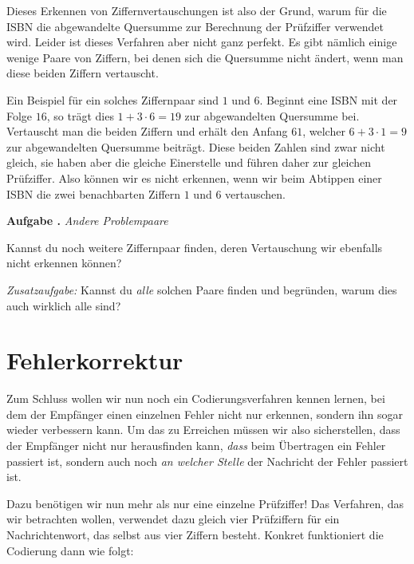 \documentclass[a4paper,ngerman,12pt]{scrartcl}
\theoremstyle{definition}
\theoremstyle{plain}
\theoremstyle{remark}
\newlength{\aufgabenskip}
\newcounter{aufgabennummer}
\newenvironment{aufgabe}[1]{
	\addtocounter{aufgabennummer}{1}
	\textbf{Aufgabe \theaufgabennummer.} \emph{#1} \par
}{\vspace{\aufgabenskip}}
\begin{document}
Dieses Erkennen von Ziffernvertauschungen ist also der Grund, warum für die ISBN die abgewandelte Quersumme zur Berechnung der Prüfziffer verwendet wird. Leider ist dieses Verfahren aber nicht ganz perfekt. Es gibt nämlich einige wenige Paare von Ziffern, bei denen sich die Quersumme nicht ändert, wenn man diese beiden Ziffern vertauscht. 

Ein Beispiel für ein solches Ziffernpaar sind $1$ und $6$. Beginnt eine ISBN mit der Folge $16$, so trägt dies $1+3\cdot 6=19$  zur abgewandelten Quersumme bei. Vertauscht man die beiden Ziffern und erhält den Anfang $61$, welcher $6+3\cdot 1=9$ zur abgewandelten Quersumme beiträgt. Diese beiden Zahlen sind zwar nicht gleich, sie haben aber die gleiche Einerstelle und führen daher zur gleichen Prüfziffer. Also können wir es nicht erkennen, wenn wir beim Abtippen einer ISBN die zwei benachbarten Ziffern $1$ und $6$ vertauschen.

\begin{aufgabe}{Andere Problempaare}
	Kannst du noch weitere Ziffernpaar finden, deren Vertauschung wir ebenfalls nicht erkennen können?
	
	\emph{Zusatzaufgabe:} Kannst du \emph{alle} solchen Paare finden und begründen, warum dies auch wirklich alle sind?
\end{aufgabe}



\section{Fehlerkorrektur}

Zum Schluss wollen wir nun noch ein Codierungsverfahren kennen lernen, bei dem der Empfänger einen einzelnen Fehler nicht nur erkennen, sondern ihn sogar wieder verbessern kann. Um das zu Erreichen müssen wir also sicherstellen, dass der Empfänger nicht nur herausfinden kann, \emph{dass} beim Übertragen ein Fehler passiert ist, sondern auch noch \emph{an welcher Stelle} der Nachricht der Fehler passiert ist.

Dazu benötigen wir nun mehr als nur eine einzelne Prüfziffer! Das Verfahren, das wir betrachten wollen, verwendet dazu gleich vier Prüfziffern für ein Nachrichtenwort, das selbst aus vier Ziffern besteht. Konkret funktioniert die Codierung dann wie folgt:
\end{document}
